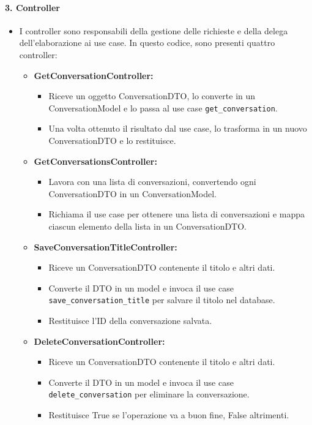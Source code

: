     \paragraph{3. Controller}
    \begin{itemize}
        \item I controller sono responsabili della gestione delle richieste e della delega dell'elaborazione ai use case. In questo codice, sono presenti quattro controller:
        \begin{itemize}
            \item \textbf{GetConversationController:}
            \begin{itemize}
                \item Riceve un oggetto ConversationDTO, lo converte in un ConversationModel e lo passa al use case \texttt{get\_conversation}.
                \item Una volta ottenuto il risultato dal use case, lo trasforma in un nuovo ConversationDTO e lo restituisce.
            \end{itemize}
            \item \textbf{GetConversationsController:}
            \begin{itemize}
                \item Lavora con una lista di conversazioni, convertendo ogni ConversationDTO in un ConversationModel.
                \item Richiama il use case per ottenere una lista di conversazioni e mappa ciascun elemento della lista in un ConversationDTO.
            \end{itemize}
            \item \textbf{SaveConversationTitleController:}
            \begin{itemize}
                \item Riceve un ConversationDTO contenente il titolo e altri dati.
                \item Converte il DTO in un model e invoca il use case \texttt{save\_conversation\_title} per salvare il titolo nel database.
                \item Restituisce l'ID della conversazione salvata.
            \end{itemize}
            \item \textbf{DeleteConversationController:}
            \begin{itemize}
                \item Riceve un ConversationDTO contenente il titolo e altri dati.
                \item Converte il DTO in un model e invoca il use case \texttt{delete\_conversation} per eliminare la conversazione.
                \item Restituisce True se l'operazione va a buon fine, False altrimenti.
            \end{itemize}
        \end{itemize}
    \end{itemize}

